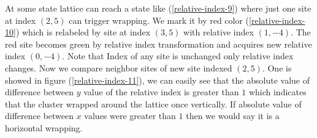  At some state lattice can reach a state like (\ref{relative-index-9}) where just one site at index $(2,5)$ can trigger wrapping. We mark it by red color (\ref{relative-index-10}) which is relabeled by site at index $(3,5)$ with relative index $(1,-4)$. The red site becomes green by relative index transformation and acquires new relative index $(0,-4)$. Note that Index of any site is unchanged only relative index changes. Now we compare neighbor sites of new site indexed $(2,5)$. One is showed in figure (\ref{relative-index-11}), we can easily see that the absolute value of difference between $y$ value of the relative index is greater than $1$ which indicates that the cluster wrapped around the lattice once vertically. If absolute value of difference between $x$ values were greater than $1$ then we would say it is a horizontal wrapping.
\begin{figure}
	\centering
	\caption{}
	\label{fig:relative-index-4}
\end{figure}




